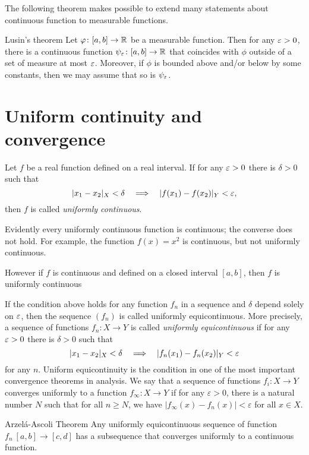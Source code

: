 The following theorem makes possible to extend many statements about continuous function to measurable functions.

\begin{thm}{Lusin's theorem}\label{thm:lusin}
Let $\varphi\colon[a,b]\to \mathbb{R}$ be a measurable function.
Then for any $\varepsilon>0$, there is a continuous function $\psi_\varepsilon\colon[a,b]\to \mathbb{R}$ that coincides with $\phi$ outside of a set of measure at most $\varepsilon$.
Moreover, if $\phi$ is bounded above and/or below by some constants, then we may assume that so is $\psi_\varepsilon$.  
\end{thm}

\section{Uniform continuity and convergence}

Let $f$ be a real function defined on a real interval.
If  for any $\varepsilon>0$ there is $\delta>0$ such that 
\[|x_1-x_2|_X<\delta\quad\Longrightarrow\quad |f(x_1)-f(x_2)|_Y<\varepsilon,\]
then $f$ is called \emph{uniformly continuous}.

Evidently every uniformly continuous function is continuous;
the converse does not hold.
For example, the function $f(x)=x^2$ is continuous, but not uniformly continuous.

However if $f$ is continuous and defined on a closed interval $[a,b]$, then $f$ is uniformly continuous

If the condition above holds for any function $f_n$ in a sequence and $\delta$ depend solely on $\varepsilon$,
then the sequence $(f_n)$ is called uniformly equicontinuous.
More precisely, 
a sequence of functions $f_n:X\to Y$ is called \emph{uniformly equicontinuous} if 
for any $\varepsilon>0$ there is $\delta>0$ such that 
\[|x_1-x_2|_X<\delta\quad\Longrightarrow\quad |f_n(x_1)-f_n(x_2)|_Y<\varepsilon\]
for any $n$.
Uniform equicontinuity is the condition in one of the most important convergence theorems in analysis. 
We say that a sequence of functions $f_i : X \to Y$ converges uniformly to a function $f_{\infty}: X \to Y$ if for any 
$\varepsilon >0$, there is a natural number $N$ such that for all $n \geq N$, we have $| f_{\infty} (x)- f_n (x) | < \varepsilon$
for all $x  \in X$.

\begin{thm}{Arzel\'{a}-Ascoli Theorem}\label{lem:equicontinuous}
Any uniformly equicontinuous sequence of function $f_n\:[a,b]\to [c,d]$ has a subsequence that converges uniformly to a continuous function. 
\end{thm}

